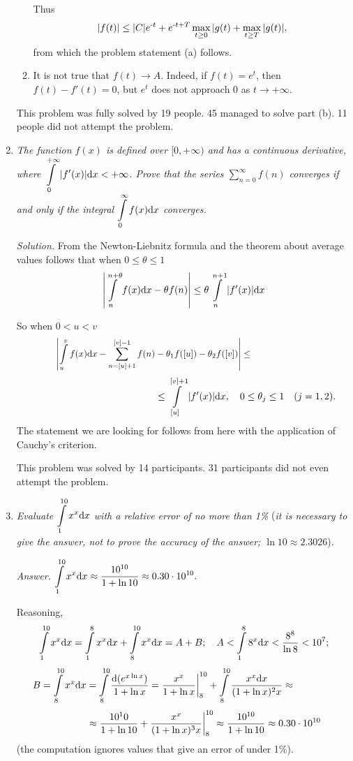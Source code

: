 \documentclass[12pt]{amsart}
\begin{document}
\begin{enumerate}
\begin{enumerate}
\quad Thus
$$|f(t)|\leq|C|e^{\text-t}+e^{\text-t+T}\max\limits_{t\geq0}|g(t)+
\max\limits_{t\geq T}|g(t)|,$$
from which the problem statement (a) follows.
\item
It is not true that $f(t)\to A$.
Indeed, if $f(t)=e^t$, then $f(t)-f'(t)=0$, but $e^t$ does not approach 0 as
$t\to+\infty$.
\end{enumerate}

This problem was fully solved by 19 people.
45 managed to solve part (b).
11 people did not attempt the problem.
\item
\textit{The function $f(x)$ is defined over $[0,+\infty)$ and has a continuous
derivative, where
$\displaystyle\int\limits_0^{+\infty}|f'(x)|\text{\normalfont d}x<+\infty$.
Prove that the series $\displaystyle\sum\limits_{n=0}^\infty f(n)$ converges if
and only if the integral
$\displaystyle\int\limits_0^\infty f(x)\text{\normalfont d}x$ converges.}

\textit{Solution.}
From the Newton-Liebnitz formula and the theorem about average values follows
that when $0\leq\theta\leq1$
$$\left|\int\limits_n^{n+\theta}f(x)\text dx-\theta f(n)\right|
\leq\theta\int\limits_n^{n+1}|f'(x)|\text dx$$

So when $0<u<v$
$$\hspace{10ex}\left|\int\limits_u^vf(x)\text dx-\sum\limits_{n=[u]+1}^{[v]-1}
f(n)-\theta_1f([u])-\theta_2f([v])\right|\leq\hspace{30ex}$$
$$\hspace{30ex}\leq\int\limits_{[u]}^{[v]+1}|f'(x)|\text dx,\quad0\leq\theta_j
\leq1\quad(j=1,2).$$
The statement we are looking for follows from here with the application of
Cauchy's criterion.

This problem was solved by 14 participants.
31 participants did not even attempt the problem.
\item
\textit{Evaluate $\displaystyle\int\limits_1^{10}x^x\text dx$ with a relative
error of no more than 1\% }(\textit{it is necessary to give the answer, not to
prove the accuracy of the answer; $\ln10\approx2.3026$}).

\textit{Answer.}
$\displaystyle\int\limits_1^{10}x^x\text dx\approx\frac{10^{10}}{1+\ln10}\approx
0.30\cdot10^{10}.$

Reasoning,
$$\int\limits_1^{10}x^x\text dx=\int\limits_1^8x^x\text dx+\int\limits_8^{10}x^x
\text dx=A+B;\quad A<\int\limits_1^88^x\text dx<\frac{8^8}{\ln8}<10^7;$$
$$B=\int\limits_8^{10}x^x\text dx=\int\limits_8^{10}\frac{\text d(e^{x\ln x})}
{1+\ln x}=\frac{x^x}{1+\ln x}\bigg\rvert_8^{10}+\int\limits_8^{10}
\frac{x^x\text dx}{(1+\ln x)^2x}\approx\hspace{10ex}$$
$$\hspace{10ex}\approx\frac{10^10}{1+\ln10}+\frac{x^x}{(1+\ln x)^3x}
\bigg\rvert_8^{10}\approx\frac{10^{10}}{1+\ln10}\approx0.30\cdot10^{10}$$
(the computation ignores values that give an error of under 1\%).


\end{enumerate}
\end{document}
